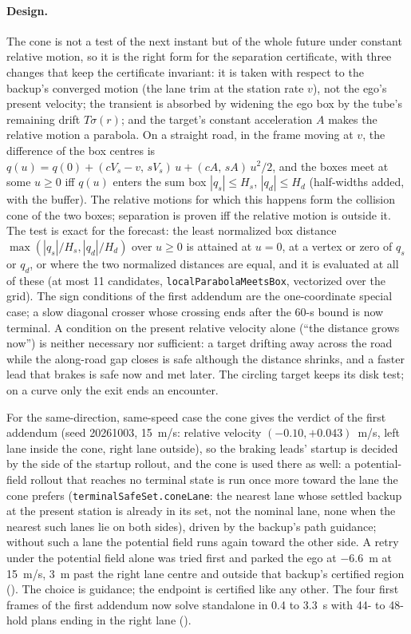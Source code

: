 \documentclass[11pt]{article}
\begin{document}
\paragraph{Design.} The cone is not a test of the next instant but of the
whole future under constant relative motion, so it is the right form for the
separation certificate, with three changes that keep the certificate
invariant: it is taken with respect to the backup's converged motion (the
lane trim at the station rate $v$), not the ego's present velocity; the
transient is absorbed by widening the ego box by the tube's remaining drift
$T\sigma(r)$; and the target's constant acceleration $A$ makes the relative
motion a parabola. On a straight road, in the frame moving at $v$, the
difference of the box centres is
$q(u)=q(0)+(cV_s-v,\,sV_s)\,u+(cA,\,sA)\,u^2/2$, and the boxes meet at some
$u\ge0$ iff $q(u)$ enters the sum box $|q_s|\le H_s$, $|q_d|\le H_d$
(half-widths added, with the buffer). The relative motions for which this
happens form the collision cone of the two boxes; separation is proven iff the
relative motion is outside it. The test is exact for the forecast: the least
normalized box distance $\max(|q_s|/H_s,|q_d|/H_d)$ over $u\ge0$ is attained
at $u=0$, at a vertex or zero of $q_s$ or $q_d$, or where the two normalized
distances are equal, and it is evaluated at all of these (at most 11
candidates, \texttt{localParabolaMeetsBox}, vectorized over the grid). The
sign conditions of the first addendum are the one-coordinate special case; a
slow diagonal crosser whose crossing ends after the 60-s bound is now
terminal. A condition on the present relative velocity alone (``the distance
grows now'') is neither necessary nor sufficient: a target drifting away
across the road while the along-road gap closes is safe although the distance
shrinks, and a faster lead that brakes is safe now and met later. The circling
target keeps its disk test; on a curve only the exit ends an encounter.

For the same-direction, same-speed case the cone gives the verdict of the
first addendum (seed 20261003, 15~m/s: relative velocity $(-0.10,+0.043)$~m/s,
left lane inside the cone, right lane outside), so the braking leads' startup
is decided by the side of the startup rollout, and the cone is used there as
well: a potential-field rollout that reaches no terminal state is run once
more toward the lane the cone prefers (\texttt{terminalSafeSet.coneLane}: the
nearest lane whose settled backup at the present station is already in its
set, not the nominal lane, none when the nearest such lanes lie on both
sides), driven by the backup's path guidance; without such a lane the
potential field runs again toward the other side. A retry under the
potential field alone was tried first and parked the ego at $-6.6$~m at
15~m/s, 3~m past the right lane centre and outside that backup's certified
region (). The choice is guidance; the
endpoint is certified like any other. The four first frames of the first
addendum now solve standalone in 0.4 to 3.3~s with 44- to 48-hold plans
ending in the right lane ().
\end{document}
